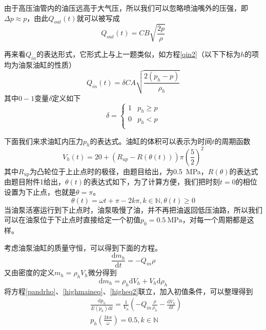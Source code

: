 \documentclass[12pt,AutoFakeBold]{article}%
\newcommand{\dif}{\mathrm{d}}
\begin{document}
    由于高压油管内的油压远高于大气压，所以我们可以忽略喷油嘴外的压强，即$\Delta p\approx p$，由此$Q_{out}(t)$就可以被写成
    \begin{equation}
        Q_{out}(t)=CB\sqrt{\frac{2p}{\rho}}
    \end{equation}\par
    再来看$Q_{in}$的表达形式，它形式上与上一题类似，如方程\ref{qin2}（以下下标为$h$的项均为油泵油缸的性质）
    \begin{equation}
        Q_{in}(t)=\delta CA\sqrt{\frac{2(p_h-p)}{\rho_h}}
        \label{qin2}
    \end{equation}
    其中$0-1$变量$\delta$定义如下
    \begin{equation}
        \delta=
        \begin{cases}
            1&p_h\geq p\\
            0&p_h<p\\
        \end{cases}
    \end{equation}\par
    下面我们来求油缸内压力$p_h$的表达式。油缸的体积可以表示为时间$t$的周期函数
    \begin{equation}
        V_h(t)=20+(R_{up}-R(\theta(t)))\pi\left(\frac{5}{2}\right)^2
    \end{equation}
    其中$R_{up}$为凸轮位于上止点时的极径，由题目给出，为\SI{0.5}{\MPa}，$R(\theta)$的表达式由题目附件1给出，$\theta(t)$的表达式如下，为了计算方便，我们把时刻$t=0$的相位设置为下止点，也就是$\theta = \pi$。
    \begin{equation}
        \theta(t)=\omega t+\pi -2k\pi,k\in\mathbb{N},\theta(t)\geq0
    \end{equation}
    当油泵活塞运行到下止点时，油泵吸慢了油，并不再把油返回低压油路，所以我们可以在油泵位于下止点时直接给定一个初值$p_0=\SI{0.5}{\MPa}$，对每一个周期都是这样。\par
    考虑油泵油缸的质量守恒，可以得到下面的方程。
    \begin{equation}
        \frac{\dif m_h}{\dif t}=-Q_{in}\rho
        \label{highmaineq}
    \end{equation}
    又由密度的定义$m_h=\rho_hV_h$微分得到
    \begin{equation}
        \dif m_h=\rho_h\dif V_h+V_h\dif\rho_h
        \label{higheq2}
    \end{equation}
    将方程\ref{pandrho}、\ref{highmaineq}、\ref{higheq2}联立，加入初值条件，可以整理得到
    \begin{equation}
        \begin{aligned}
            &\frac{\dif p_h}{E(p_h)\dif t}=\frac{1}{V_h}\left(-Q_{in}\frac{\rho}{\rho_h}-\frac{\dif V_h}{\dif t}\right)\\
            &p_h(\frac{2k\pi}{\omega})=0.5,k\in\mathbb{N}
        \end{aligned}
        \label{highmaineq2}
    \end{equation}\par
\end{document}
